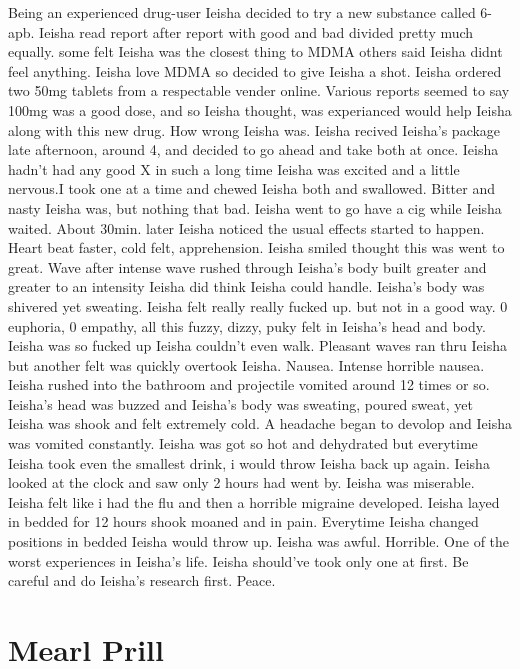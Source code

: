 \documentclass[12pt]{book}
\begin{document}
Being an experienced drug-user Ieisha decided to try a new substance called 6-apb. Ieisha read report after report with good and bad divided pretty much equally. some felt Ieisha was the closest thing to MDMA others said Ieisha didnt feel anything. Ieisha love MDMA so decided to give Ieisha a shot. Ieisha ordered two 50mg tablets from a respectable vender online. Various reports seemed to say 100mg was a good dose, and so Ieisha thought, was experianced would help Ieisha along with this new drug. How wrong Ieisha was. Ieisha recived Ieisha's package late afternoon, around 4, and decided to go ahead and take both at once. Ieisha hadn't had any good X in such a long time Ieisha was excited and a little nervous.I took one at a time and chewed Ieisha both and swallowed. Bitter and nasty Ieisha was, but nothing that bad. Ieisha went to go have a cig while Ieisha waited. About 30min. later Ieisha noticed the usual effects started to happen. Heart beat faster, cold felt, apprehension. Ieisha smiled thought this was went to great. Wave after intense wave rushed through Ieisha's body built greater and greater to an intensity Ieisha did think Ieisha could handle. Ieisha's body was shivered yet sweating. Ieisha felt really really fucked up. but not in a good way. 0 euphoria, 0 empathy, all this fuzzy, dizzy, puky felt in Ieisha's head and body. Ieisha was so fucked up Ieisha couldn't even walk. Pleasant waves ran thru Ieisha but another felt was quickly overtook Ieisha. Nausea. Intense horrible nausea. Ieisha rushed into the bathroom and projectile vomited around 12 times or so. Ieisha's head was buzzed and Ieisha's body was sweating, poured sweat, yet Ieisha was shook and felt extremely cold. A headache began to devolop and Ieisha was vomited constantly. Ieisha was got so hot and dehydrated but everytime Ieisha took even the smallest drink, i would throw Ieisha back up again. Ieisha looked at the clock and saw only 2 hours had went by. Ieisha was miserable. Ieisha felt like i had the flu and then a horrible migraine developed. Ieisha layed in bedded for 12 hours shook moaned and in pain. Everytime Ieisha changed positions in bedded Ieisha would throw up. Ieisha was awful. Horrible. One of the worst experiences in Ieisha's life. Ieisha should've took only one at first. Be careful and do Ieisha's research first. Peace.



\chapter{Mearl Prill}
\end{document}
